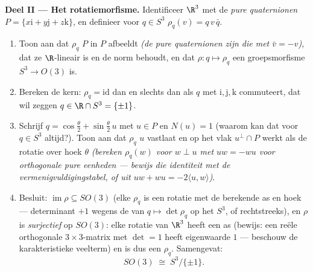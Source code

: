\begin{problem}
\medskip
\noindent\textbf{Deel II --- Het rotatiemorfisme.}
Identificeer $\R^3$ met de \emph{pure quaternionen} $P =
\{x\mathrm i + y\mathrm j + z\mathrm k\}$, en definieer voor $q
\in S^3$ $\rho_q(v) = q\,v\,\bar q$.
\begin{enumerate}[resume]
  \item Toon aan dat $\rho_q$ $P$ in $P$ afbeeldt \emph{(de pure
        quaternionen zijn die met $\bar v = -v$)}, dat ze
        $\R$-lineair is en de norm behoudt, en dat $\rho \colon q
        \mapsto \rho_q$ een groepsmorfisme $S^3 \to O(3)$ is.
  \item Bereken de kern: $\rho_q = \mathrm{id}$ dan en slechts
        dan als $q$ met $\mathrm i, \mathrm j, \mathrm k$
        commuteert, dat wil zeggen $q \in \R\cap S^3 =
        \{\pm1\}$.
  \item Schrijf $q = \cos\frac\theta2 + \sin\frac\theta2\,u$ met
        $u \in P$ en $N(u) = 1$ (waarom kan dat voor $q \in S^3$
        altijd?). Toon aan dat $\rho_q$ $u$ vastlaat en op het
        vlak $u^\perp\cap P$ werkt als de rotatie over hoek
        $\theta$ \emph{(bereken $\rho_q(w)$ voor $w \perp u$ met
        $uw = -wu$ voor orthogonale pure eenheden --- bewijs die
        identiteit met de vermenigvuldigingstabel, of uit $uw +
        wu = -2\langle u, w\rangle$)}.
  \item Besluit: $\operatorname{im}\rho \subseteq SO(3)$ (elke
        $\rho_q$ is een rotatie met de berekende as en hoek ---
        determinant $+1$ wegens de  van $q \mapsto
        \det\rho_q$ op het  $S^3$, of rechtstreeks),
        en $\rho$ is \emph{surjectief} op $SO(3)$: elke rotatie
        van $\R^3$ heeft een as (bewijs: een reële orthogonale
        $3\times3$-matrix met $\det = 1$ heeft eigenwaarde $1$
        --- beschouw de karakteristieke veelterm) en is dus een
        $\rho_q$. Samengevat:
        \[
        SO(3) \;\cong\; S^3/\{\pm 1\} .
        \]
\end{enumerate}


\end{problem}
